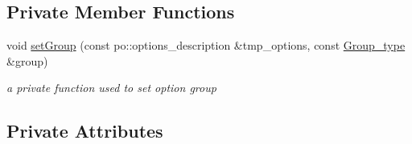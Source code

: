 \subsection*{Private Member Functions}
\begin{DoxyCompactItemize}
\item 
void \hyperlink{classOptions_ae31bd514a7a2d4386be106b7387ff2f4}{setGroup} (const po::options\_\-description \&tmp\_\-options, const \hyperlink{Options_8hpp_abca947614755a7e288afe5c44b07c98d}{Group\_\-type} \&group)
\begin{DoxyCompactList}\small\item\em a private function used to set option group \item\end{DoxyCompactList}\end{DoxyCompactItemize}
\subsection*{Private Attributes}
